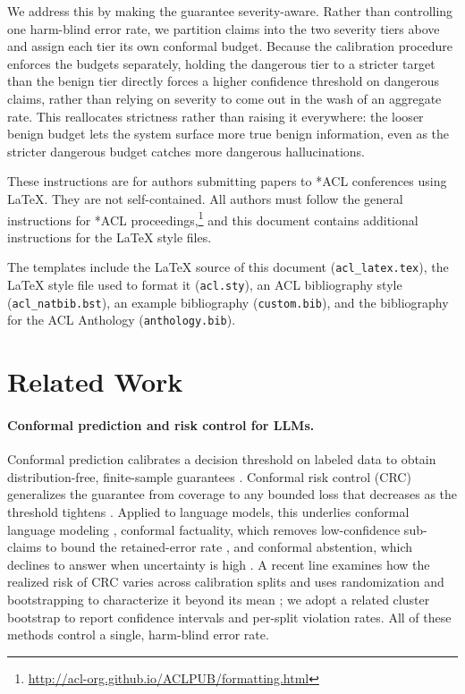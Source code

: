 \documentclass[11pt]{article}
\begin{document}
We address this by making the guarantee severity-aware. Rather than controlling one harm-blind error rate, we partition claims into the two severity tiers above and assign each tier its own conformal budget. Because the calibration procedure enforces the budgets separately, holding the dangerous tier to a stricter target than the benign tier directly forces a higher confidence threshold on dangerous claims, rather than relying on severity to come out in the wash of an aggregate rate. This reallocates strictness rather than raising it everywhere: the looser benign budget lets the system surface more true benign information, even as the stricter dangerous
budget catches more dangerous hallucinations. 


These instructions are for authors submitting papers to *ACL conferences using \LaTeX. They are not self-contained. All authors must follow the general instructions for *ACL proceedings,\footnote{\url{http://acl-org.github.io/ACLPUB/formatting.html}} and this document contains additional instructions for the \LaTeX{} style files.

The templates include the \LaTeX{} source of this document (\texttt{acl\_latex.tex}),
the \LaTeX{} style file used to format it (\texttt{acl.sty}),
an ACL bibliography style (\texttt{acl\_natbib.bst}),
an example bibliography (\texttt{custom.bib}),
and the bibliography for the ACL Anthology (\texttt{anthology.bib}).

\section{Related Work}
\paragraph{Conformal prediction and risk control for LLMs.}
Conformal prediction calibrates a decision threshold on labeled data to obtain
distribution-free, finite-sample guarantees
\citep{vovk2005algorithmic,angelopoulos2023gentle}. Conformal risk control
(CRC) generalizes the guarantee from coverage to any bounded loss that
decreases as the threshold tightens \citep{angelopoulos2024crc}. Applied to
language models, this underlies conformal language modeling
\citep{quach2024conformal}, conformal factuality, which removes low-confidence
sub-claims to bound the retained-error rate \citep{mohri2024conformal}, and
conformal abstention, which declines to answer when uncertainty is high
\citep{abbasiyadkori2024conformal}. A recent line examines how the realized
risk of CRC varies across calibration splits and uses randomization and
bootstrapping to characterize it beyond its mean \citep{pang2025bootstrap}; we
adopt a related cluster bootstrap to report confidence intervals and per-split
violation rates. All of these methods control a single, harm-blind error rate.
\end{document}
